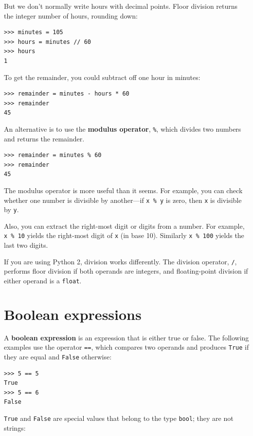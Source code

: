 \documentclass[10pt]{book}
\begin{document}
But we don't normally write hours with decimal points.  Floor
division returns the integer number of hours, rounding down:

\begin{verbatim}
>>> minutes = 105
>>> hours = minutes // 60
>>> hours
1
\end{verbatim}

To get the remainder, you could subtract off one hour in minutes:

\begin{verbatim}
>>> remainder = minutes - hours * 60
>>> remainder
45
\end{verbatim}


An alternative is to use the {\bf modulus operator}, \verb"%", which
divides two numbers and returns the remainder.

\begin{verbatim}
>>> remainder = minutes % 60
>>> remainder
45
\end{verbatim}
%
The modulus operator is more useful than it seems.  For
example, you can check whether one number is divisible by another---if
{\tt x \% y} is zero, then {\tt x} is divisible by {\tt y}.

Also, you can extract the right-most digit
or digits from a number.  For example, {\tt x \% 10} yields the
right-most digit of {\tt x} (in base 10).  Similarly {\tt x \% 100}
yields the last two digits.

If you are using Python 2, division works differently.  The
division operator, \verb"/", performs floor division if both
operands are integers, and floating-point division if either
operand is a {\tt float}.


\section{Boolean expressions}

A {\bf boolean expression} is an expression that is either true
or false.  The following examples use the
operator {\tt ==}, which compares two operands and produces
{\tt True} if they are equal and {\tt False} otherwise:

\begin{verbatim}
>>> 5 == 5
True
>>> 5 == 6
False
\end{verbatim}
%
{\tt True} and {\tt False} are special
values that belong to the type {\tt bool}; they are not strings:
\end{document}
